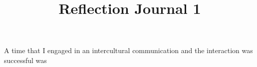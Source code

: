 \documentclass[12pt]{article}
\begin{document}
\title{Reflection Journal 1}





\par
A time that I engaged in an intercultural communication and the interaction was successful was 
\end{document}
